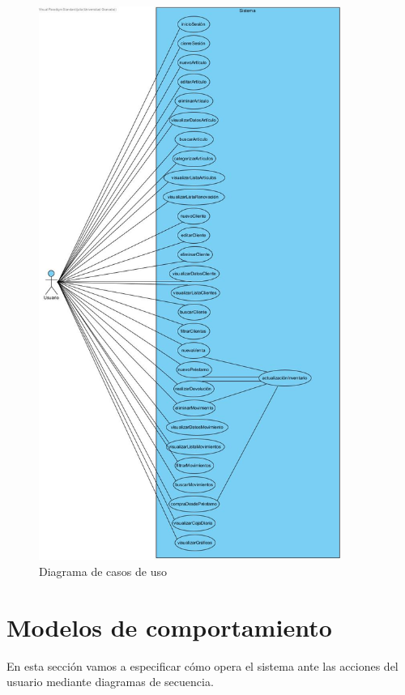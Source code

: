 \begin{figure}[H]
	\centering
	\includegraphics[width=0.88\textwidth]{imagenes/imagenesDiagramas/useCases.jpg}
	\caption{Diagrama de casos de uso}
	\label{fig:usecase}
\end{figure}

\newpage

\section{Modelos de comportamiento}

En esta sección vamos a especificar cómo opera el sistema ante las acciones del usuario mediante diagramas de secuencia. 

